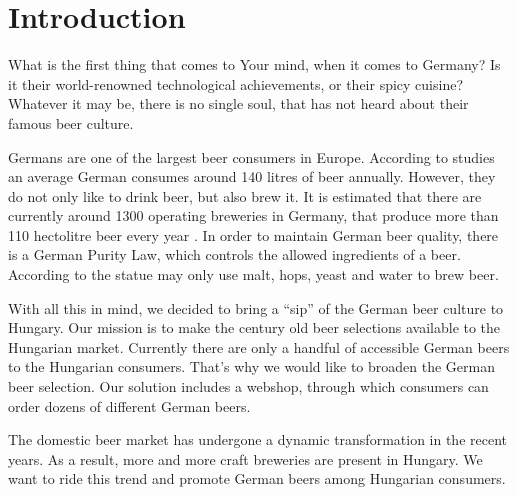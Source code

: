 

\newcommand\Title{Group Assignment}
\newcommand\Date{\today}
\newcommand\Name{Ádám Kohajda \\ Dániel Nagy \\ József Szenka \\ László Kocsis \\ Zoltán Hafner}
\newcommand\Course{Marketing}
\newcommand\Neptun{BMEGT20MW01}
\newcommand\CourseNeptun{BMEGT20MW01}






\section{Introduction}
What is the first thing that comes to Your mind, when it comes to Germany? Is it their world-renowned technological achievements, or their spicy cuisine? Whatever it may be, there is no single soul, that has not heard about their famous beer culture.

Germans are one of the largest beer consumers in Europe. According to studies an average German consumes around 140 litres of beer annually. However, they do not only like to drink beer, but also brew it. It is estimated that there are currently around 1300 operating breweries in Germany, that produce more than 110 hectolitre beer every year \cite{statista1}. In order to maintain German beer quality, there is a German Purity Law, which controls the allowed ingredients of a beer. According to the statue may only use malt, hops, yeast and water to brew beer.

With all this in mind, we decided to bring a “sip” of the German beer culture to Hungary. Our mission is to make the century old beer selections available to the Hungarian market. Currently there are only a handful of accessible German beers to the Hungarian consumers. That’s why we would like to broaden the German beer selection. Our solution includes a webshop, through which consumers can order dozens of different German beers.

The domestic beer market has undergone a dynamic transformation in the recent years. As a result, more and more craft breweries are present in Hungary. We want to ride this trend and promote German beers among Hungarian consumers.

